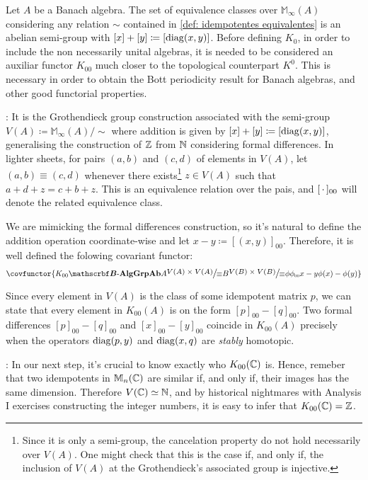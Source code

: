 \begin{definicao}
Let $A$ be a Banach algebra. The set of equivalence classes over $\mathbb M_\infty(A)$ considering any relation $\sim$ contained in \ref{def: idempotentes equivalentes} is an abelian semi-group with $[x]+[y] \coloneqq [\operatorname{diag}(x,y)]$. Before defining $K_0$, in order to include the non necessarily unital algebras, it is needed to be considered an auxiliar functor $K_{00}$ much closer to the topological counterpart $K^0$. This is necessary in order to obtain the Bott periodicity result for Banach algebras, and other good functorial properties.

\begin{itroman}
\item \textbf{}: It is the Grothendieck group construction associated with the semi-group $V({A}) \coloneqq \mathbb M_\infty\left({A}\right)/{\sim}$ where addition is given by $[x]+ [y] \coloneqq [\operatorname{diag}(x,y)]$, generalising the construction of $\operatorname{\mathbb{Z}}$ from $\operatorname{\mathbb{N}}$ considering formal differences. In lighter sheets, for pairs $(a,b)$ and $(c,d)$ of elements in $V(A)$, let $(a,b) \equiv (c,d)$ whenever there exists\footnote{Since it is only a semi-group, the cancelation property do not hold necessarily over $V(A)$. One might check that this is the case if, and only if, the inclusion of $V(A)$ at the Grothendieck's associated group is injective.} $z \in V(A)$ such that $a+d+z = c+b+z$. This is an equivalence relation over the pais, and $[\operatorname{\,\cdot\,}]_{00}$ will denote the related equivalence class. 

We are mimicking the formal differences construction, so it's natural to define the addition operation coordinate-wise and let $x-y \coloneqq [(x,y)]_{00}$. Therefore, it is well defined the folowing covariant functor:
\begin{equation*}
    \covfunctor{{K_{00}}{\BAlg}{\Ab{\Grp}}{A}{\mfrac{V(A)\times V(A)}{\equiv}}{B}{\mfrac{V(B)\times V(B)}{\equiv}}{\phi}{\sub\phi{00}}{x-y}{\phi(x)-\phi(y)}}
\end{equation*}

Since every element in $V(A)$ is the class of some idempotent matrix $p$, we can state that every element in $K_{00}(A)$ is on the form $[p]_{00} - [q]_{00}$. Two formal differences $[p]_{00}-[q]_{00}$ and $[x]_{00}-[y]_{00}$ coincide in $K_{00}(A)$ precisely when the operators $\operatorname{diag}(p,y)$ and $\operatorname{diag}(x,q)$ are \textit{stably} homotopic. 
\item \textbf{}: In our next step, it's crucial to know exactly who $K_{00}(\operatorname{\mathbb{C}})$ is. Hence, remeber that two idempotents in $\mathbb M_n(\operatorname{\mathbb{C}})$ are similar if, and only if, their images has the same dimension. Therefore $V(\operatorname{\mathbb{C}}) \simeq \operatorname{\mathbb{N}}$, and by historical nightmares with Analysis I exercises constructing the integer numbers, it is easy to infer that $K_{00}(\operatorname{\mathbb{C}}) = \operatorname{\mathbb{Z}}$. 


\end{itroman}
\end{definicao}
